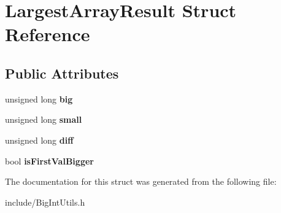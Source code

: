 \section{Largest\+Array\+Result Struct Reference}
\label{struct_largest_array_result}
\subsection*{Public Attributes}
\begin{DoxyCompactItemize}
\item 
\mbox{\label{struct_largest_array_result_a52ebc79f13532cb9db38b8dbf650f0f6}} 
unsigned long {\bfseries big}
\item 
\mbox{\label{struct_largest_array_result_aeaa178b29e92fda897893f9dacdb63b8}} 
unsigned long {\bfseries small}
\item 
\mbox{\label{struct_largest_array_result_af0928baf9a8f1ad6b2a3f4ed8202d7bc}} 
unsigned long {\bfseries diff}
\item 
\mbox{\label{struct_largest_array_result_a3d2cb9c7bbd469c3c7f3c445b7918900}} 
bool {\bfseries is\+First\+Val\+Bigger}
\end{DoxyCompactItemize}


The documentation for this struct was generated from the following file\+:\begin{DoxyCompactItemize}
\item 
include/Big\+Int\+Utils.\+h\end{DoxyCompactItemize}
